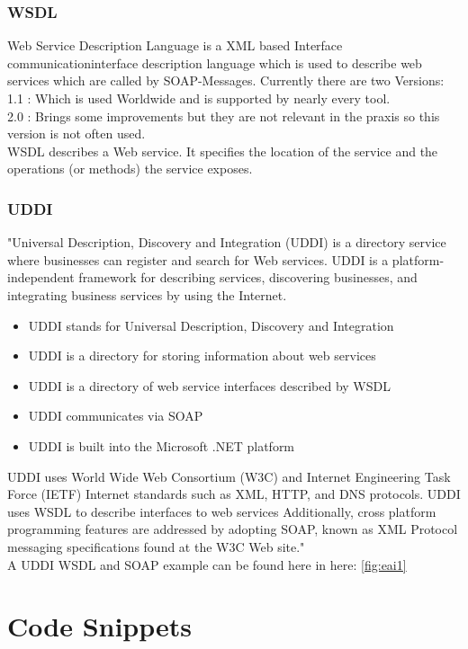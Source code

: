\documentclass[12pt]{article}
\begin{document}
	
\subsubsection{WSDL}
Web Service Description Language is a XML based Interface communicationinterface description language
which is used to describe web services which are called by SOAP-Messages.
Currently there are two Versions:\\
1.1 : Which is used Worldwide and is supported by nearly every tool. \\
2.0 : Brings some improvements but they are not relevant in the praxis so this version is not often
used.\\
WSDL describes a Web service. It specifies the location of the service and the operations (or methods) the service exposes.\\
\cite{wsdl}\newpage
\subsubsection{UDDI}
"Universal Description, Discovery and Integration (UDDI) is a directory service where businesses can register and search for Web services.
UDDI is a platform-independent framework for describing services, discovering businesses, and integrating business services by using the Internet.\\
\begin{itemize}
\item UDDI stands for Universal Description, Discovery and Integration
\item UDDI is a directory for storing information about web services
\item UDDI is a directory of web service interfaces described by WSDL
\item UDDI communicates via SOAP
\item UDDI is built into the Microsoft .NET platform
\end{itemize}
UDDI uses World Wide Web Consortium (W3C) and Internet Engineering Task Force (IETF) Internet standards such as XML, HTTP, and DNS protocols.
UDDI uses WSDL to describe interfaces to web services Additionally, cross platform programming features are addressed by adopting SOAP, known as XML Protocol messaging specifications found at the W3C Web site."\cite{uddi}\\
A UDDI WSDL and SOAP example can be found here in here: \ref{fig:eai1}
\section{Code Snippets}
\end{document}

